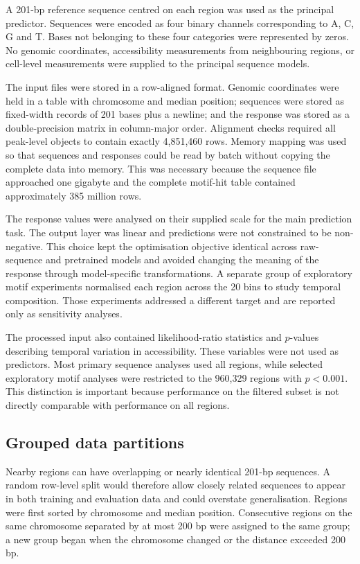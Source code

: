 \documentclass[a4paper,12pt]{article}
\begin{document}
A 201-bp reference sequence centred on each region was used as the principal predictor. Sequences were encoded as four binary channels corresponding to A, C, G and T. Bases not belonging to these four categories were represented by zeros. No genomic coordinates, accessibility measurements from neighbouring regions, or cell-level measurements were supplied to the principal sequence models.

The input files were stored in a row-aligned format. Genomic coordinates were held in a table with chromosome and median position; sequences were stored as fixed-width records of 201 bases plus a newline; and the response was stored as a double-precision matrix in column-major order. Alignment checks required all peak-level objects to contain exactly 4,851,460 rows. Memory mapping was used so that sequences and responses could be read by batch without copying the complete data into memory. This was necessary because the sequence file approached one gigabyte and the complete motif-hit table contained approximately 385 million rows.

The response values were analysed on their supplied scale for the main prediction task. The output layer was linear and predictions were not constrained to be non-negative. This choice kept the optimisation objective identical across raw-sequence and pretrained models and avoided changing the meaning of the response through model-specific transformations. A separate group of exploratory motif experiments normalised each region across the 20 bins to study temporal composition. Those experiments addressed a different target and are reported only as sensitivity analyses.

The processed input also contained likelihood-ratio statistics and $p$-values describing temporal variation in accessibility. These variables were not used as predictors. Most primary sequence analyses used all regions, while selected exploratory motif analyses were restricted to the 960,329 regions with $p<0.001$. This distinction is important because performance on the filtered subset is not directly comparable with performance on all regions.

\subsection{Grouped data partitions}

Nearby regions can have overlapping or nearly identical 201-bp sequences. A random row-level split would therefore allow closely related sequences to appear in both training and evaluation data and could overstate generalisation. Regions were first sorted by chromosome and median position. Consecutive regions on the same chromosome separated by at most 200 bp were assigned to the same group; a new group began when the chromosome changed or the distance exceeded 200 bp.
\end{document}
